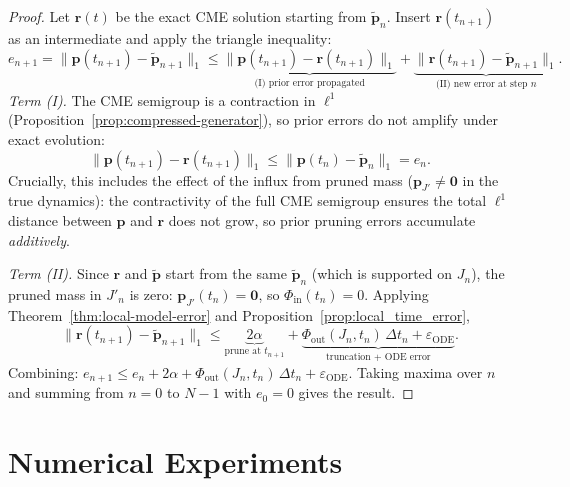 \documentclass[onefignum,onetabnum]{siamart171218}
\begin{document}
\begin{proof}
Let $\boldsymbol{r}(t)$ be the exact CME solution starting from $\widetilde{\boldsymbol{p}}_n$.  Insert $\boldsymbol{r}(t_{n+1})$ as an intermediate and apply the triangle inequality:
\[
e_{n+1} = \|\boldsymbol{p}(t_{n+1}) - \widetilde{\boldsymbol{p}}_{n+1}\|_1
\leq \underbrace{\|\boldsymbol{p}(t_{n+1}) - \boldsymbol{r}(t_{n+1})\|_1}_{\text{(I) prior error propagated}}
+ \underbrace{\|\boldsymbol{r}(t_{n+1}) - \widetilde{\boldsymbol{p}}_{n+1}\|_1}_{\text{(II) new error at step }n}.
\]
\textit{Term (I).}  The CME semigroup is a contraction in $\ell^1$ (Proposition~\ref{prop:compressed-generator}), so prior errors do not amplify under exact evolution:
\[
\|\boldsymbol{p}(t_{n+1}) - \boldsymbol{r}(t_{n+1})\|_1 \leq \|\boldsymbol{p}(t_n) - \widetilde{\boldsymbol{p}}_n\|_1 = e_n.
\]
Crucially, this includes the effect of the influx from pruned mass ($\boldsymbol{p}_{J'} \neq \boldsymbol{0}$ in the true dynamics): the contractivity of the full CME semigroup ensures the total $\ell^1$ distance between $\boldsymbol{p}$ and $\boldsymbol{r}$ does not grow, so prior pruning errors accumulate \emph{additively}.

\textit{Term (II).}  Since $\boldsymbol{r}$ and $\widetilde{\boldsymbol{p}}$ start from the same $\widetilde{\boldsymbol{p}}_n$ (which is supported on $J_n$), the pruned mass in $J'_n$ is zero: $\boldsymbol{p}_{J'}(t_n) = \boldsymbol{0}$, so $\Phi_{\mathrm{in}}(t_n) = 0$.  Applying Theorem~\ref{thm:local-model-error} and Proposition~\ref{prop:local_time_error},
\[
\|\boldsymbol{r}(t_{n+1}) - \widetilde{\boldsymbol{p}}_{n+1}\|_1 \leq \underbrace{2\alpha}_{\text{prune at }t_{n+1}} + \underbrace{\Phi_{\mathrm{out}}(J_n,t_n)\,\Delta t_n + \varepsilon_{\mathrm{ODE}}}_{\text{truncation + ODE error}}.
\]
Combining: $e_{n+1} \leq e_n + 2\alpha + \Phi_{\mathrm{out}}(J_n,t_n)\,\Delta t_n + \varepsilon_{\mathrm{ODE}}$.  Taking maxima over $n$ and summing from $n=0$ to $N-1$ with $e_0=0$ gives the result.
\end{proof}


\section{Numerical Experiments}
\label{sec:results}
\end{document}
